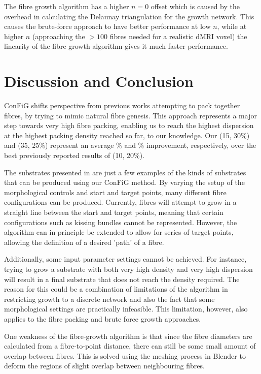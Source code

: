 The fibre growth algorithm has a higher $n=0$ offset which is caused by the overhead in calculating the Delaunay triangulation for the growth network.
This causes the brute-force approach to have better performance at low $n$, while at higher $n$ (approaching the $>100$ fibres needed for a realistic dMRI voxel) the linearity of the fibre growth algorithm gives it much faster performance.



\section{Discussion and Conclusion}
\label{sec:ipmi_discussion}
ConFiG shifts perspective from previous works attempting to pack together fibres, by trying to mimic natural fibre genesis.
This approach represents a major step towards very high fibre packing, enabling us to reach the highest dispersion at the highest packing density reached so far, to our knowledge. Our (15\degree, 30\%) and (35\degree, 25\%) represent an average \% and \% improvement, respectively, over the best previously reported results of (10\degree, 20\%)\cite{Ginsburger2018}.


The substrates presented in  are just a few examples of the kinds of substrates that can be produced using our ConFiG method.
By varying the setup of the morphological controls and start and target points, many different fibre configurations can be produced.
Currently, fibres will attempt to grow in a straight line between the start and target points, meaning that certain configurations such as kissing bundles cannot be represented.
However, the algorithm can in principle be extended to allow for series of target points, allowing the definition of a desired 'path' of a fibre.

Additionally, some input parameter settings cannot be achieved.
For instance, trying to grow a substrate with both very high density and very high dispersion will result in a final substrate that does not reach the density required.
The reason for this could be a combination of limitations of the algorithm in restricting growth to a discrete network and also the fact that some morphological settings are practically infeasible.
This limitation, however, also applies to the fibre packing and  brute force growth approaches.

One weakness of the fibre-growth algorithm is that since the fibre diameters are calculated from a fibre-to-point distance, there can still be some small amount of overlap between fibres.
This is solved using the meshing process in Blender to deform the regions of slight overlap between neighbouring fibres.

